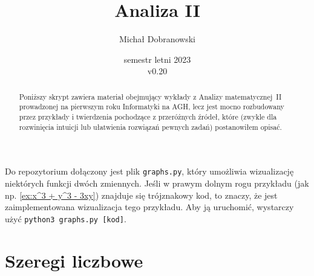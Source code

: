 \documentclass[11pt]{scrartcl}
\title{Analiza II}
\author{Michał Dobranowski}
\date{semestr letni 2023\\ v0.20}
\begin{document}
    \maketitle
    \begin{abstract}
        \noindent Poniższy skrypt zawiera materiał obejmujący wykłady z Analizy matematycznej~II prowadzonej na pierwszym roku Informatyki na AGH, lecz jest mocno rozbudowany przez przykłady i twierdzenia pochodzące z przeróżnych źródeł, które (zwykle dla rozwinięcia intuicji lub ułatwienia rozwiązań pewnych zadań) postanowiłem opisać.
    \end{abstract}
    \tableofcontents
    \eject






    Do repozytorium dołączony jest plik \texttt{graphs.py}, który umożliwia wizualizację niektórych funkcji dwóch zmiennych. Jeśli w prawym dolnym rogu przykładu (jak np. \ref{ex:x^3 + y^3 - 3xy}) znajduje się trójznakowy kod, to znaczy, że jest zaimplementowana wizualizacja tego przykładu. Aby ją uruchomić, wystarczy użyć \texttt{python3 graphs.py [kod]}.

    \section{Szeregi liczbowe}
    
\end{document}
